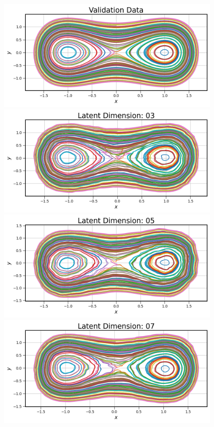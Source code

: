 \begin{figure}[!htbp]
    \centering
    \begin{minipage}{.5\textwidth}
        \includegraphics[width=\textwidth]{"../Figures/duffing_trajectories_00.png"} 
        \includegraphics[width=\textwidth]{"../Figures/duffing_trajectories_03.png"} 
        \includegraphics[width=\textwidth]{"../Figures/duffing_trajectories_05.png"} 
        \includegraphics[width=\textwidth]{"../Figures/duffing_trajectories_07.png"} 

\end{minipage}
\end{figure}
